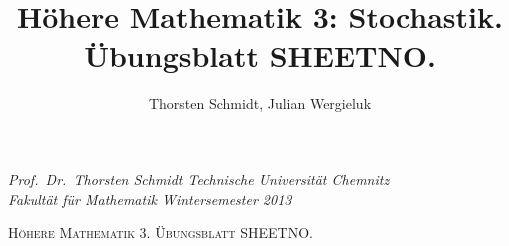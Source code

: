 \documentclass[11pt,a4paper,oldfontcommands,onecolumn,draft]{memoir}
\title{Höhere Mathematik 3: Stochastik. Übungsblatt SHEETNO.}
\author{Thorsten Schmidt, Julian Wergieluk}\date{}
\begin{document}
\pagestyle{empty}

{\itshape
Prof.\ Dr.\ Thorsten Schmidt \hfill Technische Universität Chemnitz \\
Fakultät für Mathematik \hfill Wintersemester 2013
}


\begin{center}
    {\LARGE\scshape Höhere Mathematik 3. Übungsblatt SHEETNO. \\}
\end{center}

\pagestyle{plain}
\sloppy
\end{document}
